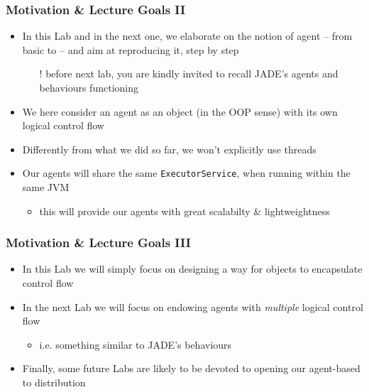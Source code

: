 \documentclass[presentation]{beamer}\mode<presentation>{\usetheme{AMSCesenaPurpleAndGold}}
\begin{document}
\begin{frame}
\frametitle{Motivation \& Lecture Goals II}

\begin{itemize}
	\item In this Lab and in the next one, we elaborate on the notion of agent -- from basic to \jade{} -- and aim at reproducing it, step by step
	\begin{itemize}
	    \item[!] \alert{before next lab}, you are kindly invited to recall JADE's agents and behaviours functioning
	\end{itemize}
	
	\vfill
	
	\item We here consider an agent as an object (in the OOP sense) with its own \alert{logical} control flow
	
	\vfill
	
	\item Differently from what we did so far, we won't explicitly use \alert{threads}
	
	\vfill
	
	\item Our agents will share the same \texttt{ExecutorService}, when running within the same JVM
	\begin{itemize}
	    \item this will provide our agents with great \alert{scalabilty \& lightweightness}
	\end{itemize}
\end{itemize}

\end{frame}

\begin{frame}
\frametitle{Motivation \& Lecture Goals III}

\begin{itemize}
	\item In this Lab we will simply focus on designing a way for objects to encapsulate control flow
	
	\vfill
	
	\item In the next Lab we will focus on endowing agents with \emph{multiple} \alert{logical} control flow
	\begin{itemize}
	    \item i.e. something similar to JADE's behaviours
	\end{itemize}
	
	\vfill
	
	\item Finally, some future Labs are likely to be devoted to opening our agent-based to \alert{distribution}
	
\end{itemize}

\end{frame}
\end{document}
